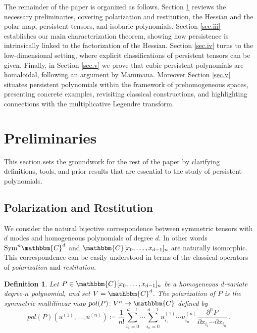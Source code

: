 \documentclass[aps,floatfix,groupedaddress,superscriptaddress,longbibliography,footinbib,notitlepage,showpacs]{revtex4-1}
\newtheorem{definition}[theorem]{Definition}
\begin{document}
The remainder of the paper is organized as follows. Section \ref{sec.ii} reviews the necessary preliminaries, covering polarization and restitution, the Hessian and the polar map, persistent tensors, and isobaric polynomials. Section \ref{sec.iii} establishes our main characterization theorem, showing how persistence is intrinsically linked to the factorization of the Hessian. Section \ref{sec.iv} turns to the low-dimensional setting, where explicit classifications of persistent tensors can be given. Finally, in Section \ref{sec.v} we prove that cubic persistent polynomials are homaloidal, following an argument by Mammana. Moreover Section \ref{sec.v} situates persistent polynomials within the framework of prehomogeneous spaces, presenting concrete examples, revisiting classical constructions, and highlighting connections with the multiplicative Legendre transform.

\section{Preliminaries}\label{sec.ii}

This section sets the groundwork for the rest of the paper by clarifying definitions, tools, and prior results that are essential to the study of persistent polynomials.

\subsection{Polarization and Restitution}\label{subsec:polrest}

We consider the natural bijective correspondence between symmetric tensors with $d$ modes and homogeneous polynomials of degree $d$. In other words $\mathrm{Sym}^n\mathbbm{C}^d$ and $\mathbbm{C}[x_0,\ldots, x_{d-1}]_n$ are naturally isomorphic.  This correspondence can be easily understood in terms of the classical operators of \emph{polarization} and \emph{restitution}.

\begin{definition}
Let $P\in\mathbbm{C}[x_0,\ldots, x_{d-1}]_n$ be a homogeneous $d$-variate degree-$n$ polynomial, and set $V=\mathbbm{C}^d$.  
The \emph{polarization} of $P$ is the symmetric multilinear map $pol(P)\colon V^{n}\to\mathbbm{C}$ defined by
\begin{equation}
pol(P)(u^{(1)},\ldots, u^{(n)}) \coloneqq \frac{1}{n!}\sum_{i_1=0}^{d-1}\cdots\sum_{i_n=0}^{d-1}
u^{(1)}_{i_1}\cdots u^{(n)}_{i_n}\frac{\partial^n P}{\partial x_{i_1}\cdots \partial x_{i_n}}\,.
\end{equation}
\end{definition}
\end{document}
